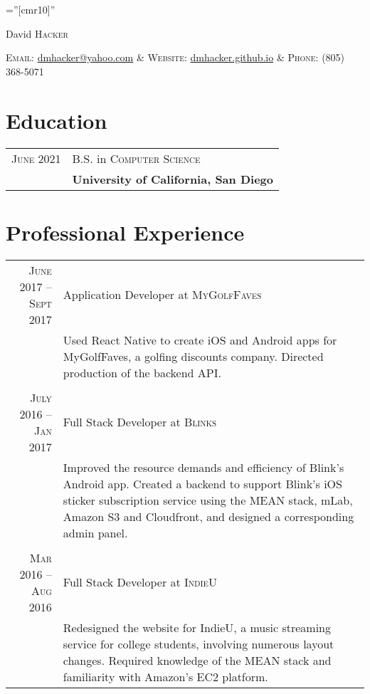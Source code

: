 \documentclass[a4paper,10pt]{article}
\begin{document}
\pagestyle{empty} %

\font\fb=''[cmr10]'' %

\par{\centering
	{
		\Huge David \textsc{Hacker}
	}
\bigskip\par}

\par{\centering
	{
		\textsc{Email:} \href{dmhacker@yahoo.com}{dmhacker@yahoo.com} &
		\textsc{Website:} \href{dmhacker.github.io}{dmhacker.github.io} &
		\textsc{Phone:} (805) 368-5071
	}
\bigskip\par}


\section{Education}
\begin{tabular}{rl}
\textsc{June} 2021 & B.S. in \textsc{Computer Science} \\ 
	& \normalsize\textbf{University of California, San Diego}
\end{tabular}

\section{Professional Experience}
\begin{tabular}{r|p{11cm}}

\textsc{June 2017 – Sept 2017} & Application Developer at \textsc{MyGolfFaves} \\
&\footnotesize{Used React Native to create iOS and Android apps for MyGolfFaves, a golfing discounts company. Directed production of the backend API.} \\
\multicolumn{2}{c}{} \\
\textsc{July 2016 – Jan 2017} & Full Stack Developer at \textsc{Blinks} \\
&\footnotesize{Improved the resource demands and efficiency of Blink’s Android app. Created a backend to support Blink’s iOS sticker subscription service using the MEAN stack, mLab, Amazon S3 and Cloudfront, and designed a corresponding admin panel.} \\
\multicolumn{2}{c}{} \\
\textsc{Mar 2016 – Aug 2016} & Full Stack Developer at \textsc{IndieU} \\
&\footnotesize{Redesigned the website for IndieU, a music streaming service for college students, involving numerous layout changes. Required knowledge of the MEAN stack and familiarity with Amazon's EC2 platform.}
\end{tabular}
\end{document}
